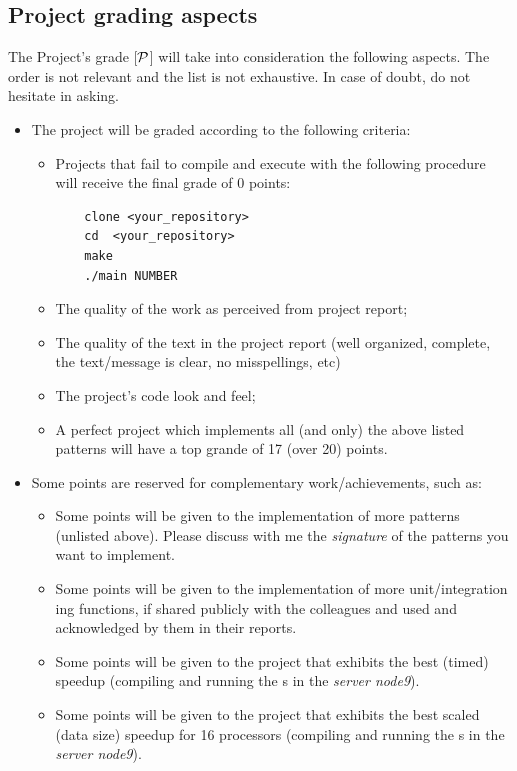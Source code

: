 \documentclass[11pt]{article}
\begin{document}
\subsection{Project grading aspects}

The Project's grade [$\cal{P}$] will take into consideration the following aspects.  The order is not relevant and the list is not exhaustive. In case of doubt, do not hesitate in asking.

\begin{itemize}
  \item The project will be graded according to the following criteria:
  \begin{itemize}
    \item Projects that fail to compile and execute with the following procedure will receive the final grade of 0 points:
\begin{verbatim}
    clone <your_repository>
    cd  <your_repository>
    make
    ./main NUMBER
\end{verbatim}
    \item The quality of the work as perceived from project report;
    \item The quality of the text in the project report (well organized, complete, the text/message is clear, no misspellings, etc)
    \item The project's code look and feel;
    \item A perfect project which implements all (and only) the above listed patterns will have a top grande of 17 (over 20) points.
  \end{itemize}
  \item Some points are reserved for complementary work/achievements, such as:
  \begin{itemize}
    \item Some points will be given to the implementation of more patterns (unlisted above).  Please discuss with me the \emph{signature} of the patterns you want to implement.
    \item Some points will be given to the implementation of more unit/integration ing functions, if shared publicly with the colleagues and used and acknowledged by them in their reports.
    \item Some points will be given to the project that exhibits the best (timed) speedup (compiling and running the s in the \emph{server node9}).
    \item Some points will be given to the project that exhibits the best scaled (data size) speedup for 16 processors (compiling and running the s in the \emph{server node9}).
  \end{itemize}
    
\end{itemize}
\end{document}
